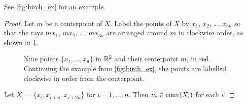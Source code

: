 \begin{remark}
See \cref{fig:birch_ex} for an example.
\end{remark}\begin{proof}

Let $m$ be a centerpoint of $X$. Label the points of $X$ by $x_1$, $x_2$, \ldots, $x_{3n}$ so that the rays $mx_1$, $mx_2$, \ldots, $mx_{3n}$ are arranged around $m$ in clockwise order, as shown in \cref{fig:birch_proof1}.
\begin{figure}[ht]
\begin{center}
\end{center}
\caption{Nine points $\{x_1,\dotsc,x_9\}$ in $\mathbb{R}^2$ and their centerpoint $m$, in red. Continuing the example from \cref{fig:birch_ex}, the points are labelled clockwise in order from the centerpoint. }\label{fig:birch_proof1}
\end{figure}
Let $X_i = \{ x_i, x_{i+n}, x_{i+2n}\}$ for $i=1,\dotsc, n$. Then $m\in \operatorname{conv}(X_i)$ for each $i$.


\end{proof}
